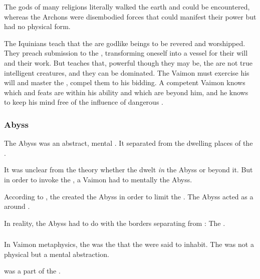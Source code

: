 The gods of many religions literally walked the earth and could be encountered, whereas the Archons were disembodied forces that could manifest their power but had no physical form. 

The Iquinians teach that the \Archons are godlike beings to be revered and worshipped. 
They preach submission to the \sephiroth, transforming oneself into a vessel for their will and their work. 
But \ClanGeican teaches that, powerful though they may be, the \Archons are not true intelligent creatures, and they can be dominated. 
The Vaimon must exercise his will and master the \Archons, compel them to his bidding. 
A competent Vaimon knows which \Archons and feats are within his ability and which are beyond him, and he knows to keep his mind free of the influence of dangerous \Archons. 






\subsubsection{Abyss}
The Abyss was an abstract, mental . 
It separated  from the dwelling places of the \qliphoth. 

It was unclear from the theory whether the \qliphoth dwelt \emph{in} the Abyss or beyond it.
But in order to invoke the \qliphoth, a Vaimon had to mentally  the Abyss. 

According to , the \sephiroth created the Abyss in order to limit the . 
The Abyss acted as a  around \Atziluth. 

In reality, the Abyss had to do with the borders separating \Miith from :
The . 





\subsubsection{\Empyrean}
\index{\empyrean}
In Vaimon metaphysics, the \quo{\empyrean} was the  that the \Archons{} were said to inhabit. 
The \empyrean{} was not a physical  but a mental abstraction. 

 was a part of the \empyrean. 





